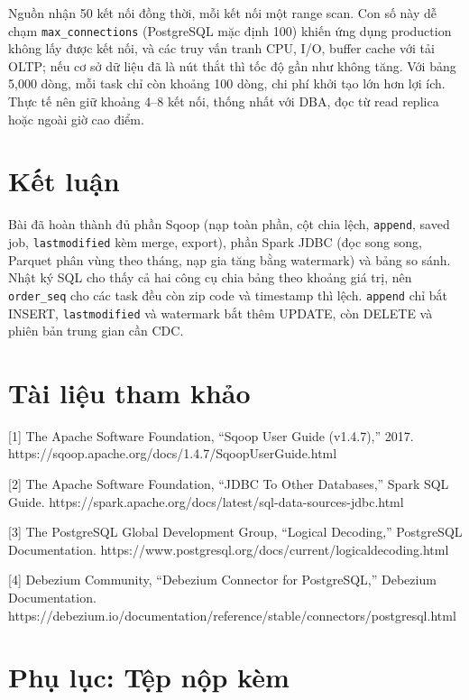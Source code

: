 \documentclass[
  12pt,
  a4paper,
]{article}
\begin{document}
Nguồn nhận 50 kết nối đồng thời, mỗi kết nối một range scan. Con số này
dễ chạm \texttt{max\_connections} (PostgreSQL mặc định 100) khiến ứng
dụng production không lấy được kết nối, và các truy vấn tranh CPU, I/O,
buffer cache với tải OLTP; nếu cơ sở dữ liệu đã là nút thắt thì tốc độ
gần như không tăng. Với bảng 5,000 dòng, mỗi task chỉ còn khoảng 100
dòng, chi phí khởi tạo lớn hơn lợi ích. Thực tế nên giữ khoảng 4--8 kết
nối, thống nhất với DBA, đọc từ read replica hoặc ngoài giờ cao điểm.

\section{Kết luận}\label{sec:l04-conclusion}

Bài đã hoàn thành đủ phần Sqoop (nạp toàn phần, cột chia lệch,
\texttt{append}, saved job, \texttt{lastmodified} kèm merge, export),
phần Spark JDBC (đọc song song, Parquet phân vùng theo tháng, nạp gia
tăng bằng watermark) và bảng so sánh. Nhật ký SQL cho thấy cả hai công
cụ chia bảng theo khoảng giá trị, nên \texttt{order\_seq} cho các task
đều còn zip code và timestamp thì lệch. \texttt{append} chỉ bắt INSERT,
\texttt{lastmodified} và watermark bắt thêm UPDATE, còn DELETE và phiên
bản trung gian cần CDC.

\section*{Tài liệu tham khảo}\label{tuxe0i-liux1ec7u-tham-khux1ea3o}

{[}1{]} The Apache Software Foundation, ``Sqoop User Guide (v1.4.7),''
2017. https://sqoop.apache.org/docs/1.4.7/SqoopUserGuide.html

{[}2{]} The Apache Software Foundation, ``JDBC To Other Databases,''
Spark SQL Guide.
https://spark.apache.org/docs/latest/sql-data-sources-jdbc.html

{[}3{]} The PostgreSQL Global Development Group, ``Logical Decoding,''
PostgreSQL Documentation.
https://www.postgresql.org/docs/current/logicaldecoding.html

{[}4{]} Debezium Community, ``Debezium Connector for PostgreSQL,''
Debezium Documentation.
https://debezium.io/documentation/reference/stable/connectors/postgresql.html

\section*{Phụ lục: Tệp nộp
kèm}\label{phux1ee5-lux1ee5c-tux1ec7p-nux1ed9p-kuxe8m}
\end{document}

